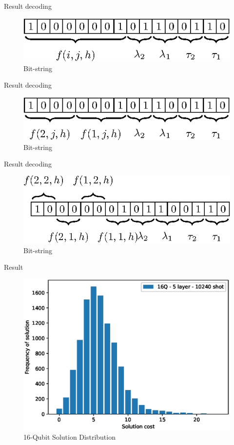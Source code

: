 \documentclass[14pt, aspectratio=169]{beamer}
\begin{document}
\begin{frame}{Result decoding}
    \begin{figure}
        \centering
        \includegraphics[width=0.7\linewidth]{images/illustration/bin_string_1.eps}
        \caption{Bit-string}
        \label{fig:bin_string_1}
    \end{figure}
\end{frame}

\begin{frame}{Result decoding}
    \begin{figure}
        \centering
        \includegraphics[width=0.7\linewidth]{images/illustration/bin_string_2.eps}
        \caption{Bit-string}
        \label{fig:bin_string_2}
    \end{figure}
\end{frame}

\begin{frame}{Result decoding}
    \begin{figure}
        \centering
        \includegraphics[width=0.7\linewidth]{images/illustration/bin_string_3.eps}
        \caption{Bit-string}
        \label{fig:bin_string_3}
    \end{figure}
\end{frame}

\begin{frame}{Result}
    \begin{figure}
        \includegraphics[width=0.55\linewidth]{images/prob_solutions/16_5_10240_prob-solution.eps}
        \caption{16-Qubit Solution Distribution  }
        \label{fig:cost_prob_16}
    \end{figure}
\end{frame}
\end{document}
